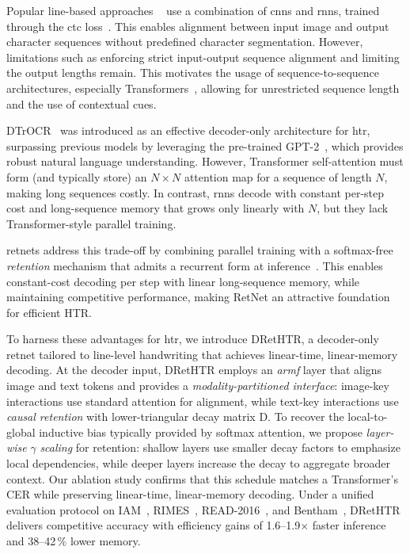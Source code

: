 \documentclass[times, review, 10pt]{elsarticle}
\begin{document}
Popular line-based approaches ~\cite{CNNBiLSTMCTC,LSTM-RNN-CTC} use a combination of \acp{cnn} and \acp{rnn}, trained through the \ac{ctc} loss~\cite{CTC}.
This enables alignment between input image and output character sequences without predefined character segmentation.
However, limitations such as enforcing strict input-output sequence alignment and limiting the output lengths remain.
This motivates the usage of sequence-to-sequence architectures, especially Transformers~\cite{Transformer}, allowing for unrestricted sequence length and the use of contextual cues.

DTrOCR~\cite{DTrOCR} was introduced as an effective decoder-only architecture for \ac{htr}, surpassing previous models by leveraging the pre-trained GPT-2~\cite{gpt2}, which provides robust natural language understanding.
However, Transformer self-attention must form (and typically store) an $N\times N$ attention map for a sequence of length $N$, making long sequences costly.
In contrast, \acp{rnn} decode with constant per-step cost and long-sequence memory that grows only linearly with $N$, but they lack Transformer-style parallel training.

\acp{retnet} address this trade-off by combining parallel training with a softmax-free \emph{retention} mechanism that admits a recurrent form at inference~\cite{retnet}.
This enables constant-cost decoding per step with linear long-sequence memory, while maintaining competitive performance, making RetNet an attractive foundation for efficient HTR.

To harness these advantages for \ac{htr}, we introduce DRetHTR, a decoder-only \ac{retnet} tailored to line-level handwriting that achieves linear-time, linear-memory decoding. At the decoder input, DRetHTR employs an \emph{\ac{armf}} layer that aligns image and text tokens and provides a \emph{modality-partitioned interface}: image-key interactions use standard attention for alignment, while text-key interactions use \emph{causal retention} with lower-triangular decay matrix D. To recover the local-to-global inductive bias typically provided by softmax attention, we propose \emph{layer-wise} $\gamma$ \emph{scaling} for retention: shallow layers use smaller decay factors to emphasize local dependencies, while deeper layers increase the decay to aggregate broader context. Our ablation study confirms that this schedule matches a Transformer’s CER while preserving linear-time, linear-memory decoding. Under a unified evaluation protocol on IAM~\cite{Marti2002IAM}, RIMES~\cite{RIMES}, READ-2016~\cite{READ2016}, and Bentham~\cite{Bentham}, DRetHTR delivers competitive accuracy with efficiency gains of \mbox{1.6–1.9$\times$} faster inference and \mbox{38–42\,\%} lower memory.
\end{document}

